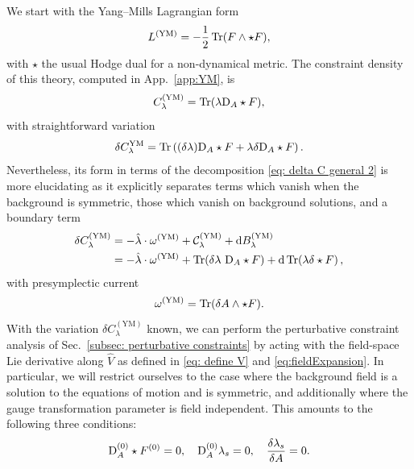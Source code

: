 \documentclass[]{jkpaper}
\theoremstyle{plain}
\theoremstyle{definition}
\newcommand{\sd}{\mathrm {d}}
\newcommand{\fd}{\delta}
\newcommand{\DD}[1]{\text{D}_A#1}
\begin{document}
We start with the Yang--Mills Lagrangian form
\begin{equation}
    \begin{split}
        L^{(\text{YM})} &= -\frac{1}{2} \Tr(F\wedge\star F),\\
    \end{split}
\end{equation}
with $\star$ the usual Hodge dual for a non-dynamical metric.
The constraint density of this theory, computed in App.~\ref{app:YM}, is 
\begin{equation}
    C^{(\text{YM})}_\lambda = \Tr(\lambda \DD \star F),
\end{equation}
with straightforward variation
\begin{equation}
    \delta C_{\lambda}^{\text{YM}}= \Tr\left((\delta\lambda) \DD\star F+\lambda\delta \DD\star F\right).
\end{equation}
Nevertheless, its form in terms of the decomposition \eqref{eq: delta C general 2} is more elucidating as it explicitly separates terms which vanish when the background is symmetric, those which vanish on background solutions, and a boundary term
\begin{equation}
    \begin{split}
        \delta C^{(\text{YM})}_{\lambda} 
    &=-\hat{\lambda}\cdot \omega^{(\text{YM})} + \mathcal{C}^{(\text{YM})}_{\lambda}+\sd B^{(\text{YM})}_\lambda\\
    &=-\hat{\lambda}\cdot \omega^{(\text{YM})} + \Tr(\delta\lambda ~\DD\star F)+\sd\Tr(\lambda \fd \star F)\,,
    \end{split}
\end{equation}
with presymplectic current
\begin{equation}
    \omega^{(\text{YM})} = \Tr(\delta A \wedge \star F).
\end{equation}
With the variation $\delta C^{(\text{YM})}_{\lambda}$ known, we can perform the perturbative constraint analysis of Sec.~\ref{subsec: perturbative constraints} by acting with the field-space Lie derivative along $\hat{V}$ as defined in \eqref{eq: define V} and \eqref{eq:fieldExpansion}. In particular, we will restrict ourselves to the case where the background field is a solution to the equations of motion and is symmetric, and additionally where the gauge transformation parameter is field independent. This amounts to the following three conditions:
\begin{equation}
    \DD^{(0)} \star F^{(0)} = 0, \quad \DD^{(0)}\lambda_s = 0, \quad \fdv{\lambda_s}{A} = 0.
\end{equation}
\end{document}
